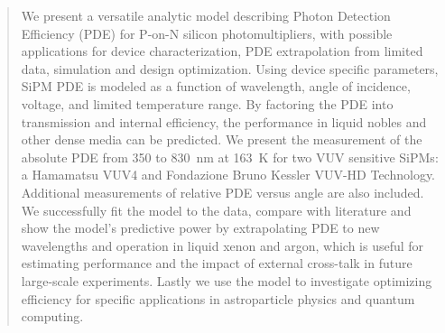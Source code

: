 \begin{abstract}
We present a versatile analytic model describing Photon Detection Efficiency (PDE) for P-on-N silicon photomultipliers, with possible applications for device characterization, PDE extrapolation from limited data, simulation and design optimization. Using device specific parameters, SiPM PDE is modeled as a function of wavelength, angle of incidence, voltage, and limited temperature range. By factoring the PDE into transmission and internal efficiency, the performance in liquid nobles and other dense media can be predicted. We present the measurement of the absolute PDE from 350 to 830~nm at 163~K for two VUV sensitive SiPMs: a Hamamatsu VUV4 and Fondazione Bruno Kessler VUV-HD Technology. Additional measurements of relative PDE versus angle are also included. We successfully fit the model to the data, compare with literature and show the model's predictive power by extrapolating PDE to new wavelengths and operation in liquid xenon and argon, which is useful for estimating performance and the impact of external cross-talk in future large-scale experiments. Lastly we use the model to investigate optimizing efficiency for specific applications in astroparticle physics and quantum computing.
\end{abstract}